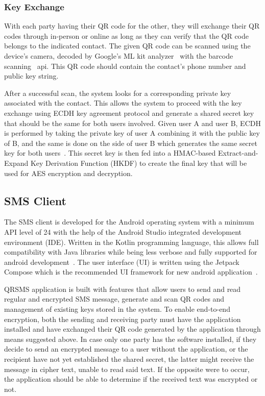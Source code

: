 \documentclass{report}
\begin{document}
\subsubsection{Key Exchange}
With each party having their QR code for the other, they will exchange
their QR codes through in-person or online as long as they can verify that
the QR code belongs to the indicated contact. The given QR code can be
scanned using the device's camera, decoded by Google's ML kit analyzer~\cite{mlkit}
with the barcode scanning~\cite{barcode_scanning} api. This QR code should
contain the contact's phone number and public key string.

After a successful scan, the system looks for a corresponding private key
associated with the contact. This allows the system to proceed with
the key exchange using ECDH key agreement protocol and generate a shared
secret key that should be the same for both users involved. Given user A and
user B, ECDH is performed by taking the private key of user A
combining it with the public key of B, and the same is done on the side of user B which generates the same secret key for both users~\cite{IBM_2023}.
This secret key is then fed into a HMAC-based Extract-and-Expand Key
Derivation Function (HKDF) to create the final key that will be used for AES encryption and decryption.

\subsection{SMS Client}
The SMS client is developed for the Android operating system with a minimum
API level of 24 with the help of the Android Studio integrated development
environment (IDE). Written in the Kotlin programming language, this allows
full compatibility with Java libraries while being less verbose and fully
supported for android development~\cite{Moskala_Wojda_2017}. The
user interface (UI) is written using the Jetpack Compose which
is the recommended UI framework for new android application~\cite{android_recommendations}.

QRSMS application is built with features that allow users to send and read
regular and encrypted SMS message, generate and scan QR codes and management
of existing keys stored in the system. To enable end-to-end encryption,
both the sending and receiving party must
have the application installed and have exchanged their QR code generated by
the application through means suggested above. In case only one party
has the software installed, if they decide to send an encrypted message to
a user without the application, or the recipient have not yet established the
shared secret, the latter might receive the message in
cipher text, unable to read said text. If the opposite were to occur,
the application should be able to determine if the received text was encrypted
or not.
\end{document}
